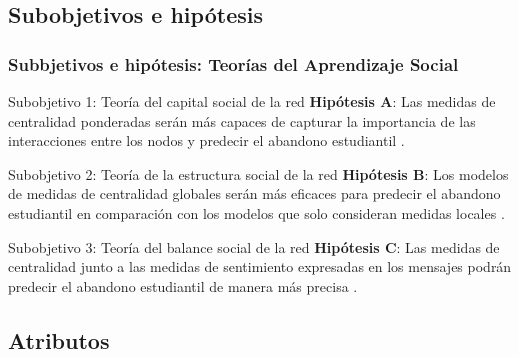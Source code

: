 \documentclass{beamer}
\begin{document}
\subsection{Subobjetivos e hipótesis}
\begin{frame}
	\frametitle{Subbjetivos e hipótesis: Teorías del Aprendizaje Social}
	\begin{block}{Subobjetivo 1: Teoría del capital social de la red}
		\textbf{Hipótesis A}: Las medidas de centralidad ponderadas serán más capaces de capturar la importancia de las interacciones entre los nodos y predecir el abandono estudiantil \citep{wasko_why_2005, barrat2004a}.
		
	\end{block}
	\begin{block}{Subobjetivo 2: Teoría de la estructura social de la red}
		\textbf{Hipótesis B}: Los modelos de medidas de centralidad globales serán más eficaces para predecir el abandono estudiantil en comparación con los modelos que solo consideran medidas locales \citep{krause_social_2007, abbasi2013a, Mahmoud_2021}.
		
	\end{block}
	\begin{block}{Subobjetivo 3: Teoría del balance social de la red}
		\textbf{Hipótesis C}: Las medidas de centralidad junto a las medidas de sentimiento expresadas en los mensajes podrán predecir el abandono estudiantil de manera más precisa \citep{kim2012a, rawlings_structural_2017, marcos_learning_2019}.
	\end{block}
\end{frame}

\subsection{Atributos}
\end{document}
